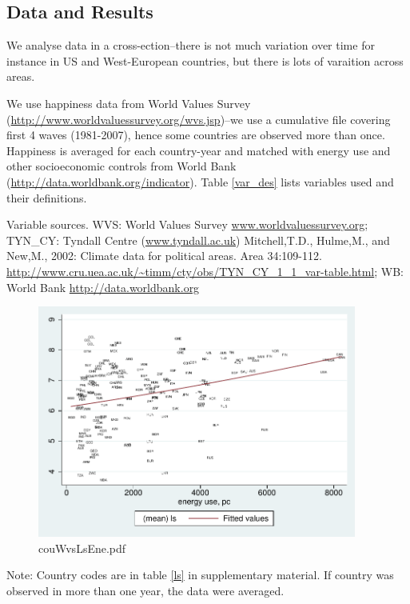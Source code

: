 \documentclass[10pt, letterpaper]{article}
\begin{document}
\begin{spacing}{1.4}
\section{Data and Results}

We analyse data in a cross-ection--there is not much variation over time for
instance in US and West-European countries, %
 but there is lots of varaition across areas.

We use happiness data from World Values Survey
(\url{http://www.worldvaluessurvey.org/wvs.jsp})--we use a cumulative file
covering first 4 waves (1981-2007), hence some countries are observed more than
once. Happiness is averaged for each country-year and matched with energy use
and other  socioeconomic controls from World Bank
(\url{http://data.worldbank.org/indicator}). Table \ref{var_des} lists variables
used and their definitions.



{\scriptsize \noindent Variable sources. WVS: World Values Survey \url{www.worldvaluessurvey.org};
TYN\_CY: Tyndall Centre (\url{www.tyndall.ac.uk}) Mitchell,T.D., Hulme,M., and
New,M., 2002: Climate data for political areas. Area
34:109-112. \url{http://www.cru.uea.ac.uk/~timm/cty/obs/TYN_CY_1_1_var-table.html};
WB: World Bank \url{http://data.worldbank.org}}


\begin{figure}[H]
 \includegraphics[height=3in]{graphsAndTables/couWvsLsEne.pdf}\centering
\caption{couWvsLsEne.pdf}\label{couWvsLsEne.pdf}
\end{figure}
{\scriptsize Note: Country codes are in table \ref{ls} in supplementary
  material. If country was observed in more than one year, the data were averaged.}


\end{spacing}
\end{document}
